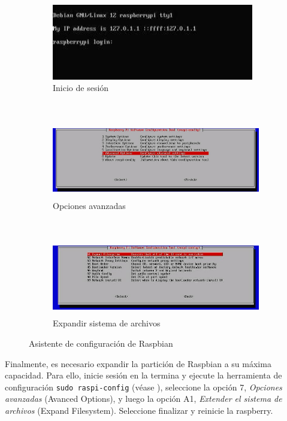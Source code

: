 \documentclass[letterpaper,10.5pt]{article}
\begin{document}
\begin{figure}[H]
	\centering%
	\begin{subfigure}[b]{0.5\linewidth}
		\centering
		\includegraphics[width=0.9\linewidth,height=33mm,keepaspectratio]{img/p01-04-raspiconfig-1.jpg} %
		\caption{Inicio de sesión}
		\label{fig:fs-expand-step-1} %
	\end{subfigure}\\
	\begin{subfigure}[b]{0.5\linewidth}
		\centering
		\includegraphics[width=0.9\linewidth,height=33mm,keepaspectratio]{img/p01-04-raspiconfig-2.jpg} %
		\caption{Opciones avanzadas}
		\label{fig:fs-expand-step-2} %
	\end{subfigure}\\
	\begin{subfigure}[b]{0.5\linewidth}
		\centering
		\includegraphics[width=0.9\linewidth,height=33mm,keepaspectratio]{img/p01-04-raspiconfig-3.jpg} %
		\caption{Expandir sistema de archivos}
		\label{fig:fs-expand-step-3} %
	\end{subfigure}%
	\caption{Asistente de configuración de Raspbian}%
	\label{fig:raspberry-fs-expand} %
\end{figure}


Finalmente, es necesario expandir la partición de Raspbian a su máxima capacidad.
Para ello, inicie sesión en la termina y ejecute la herramienta de configuración \texttt{sudo raspi-config} (véase ), seleccione la opción 7, \textit{Opciones avanzadas} (Avanced Options), y luego la opción A1, \textit{Extender el sistema de archivos} (Expand Filesystem).
Seleccione finalizar y reinicie la raspberry.
\end{document}
